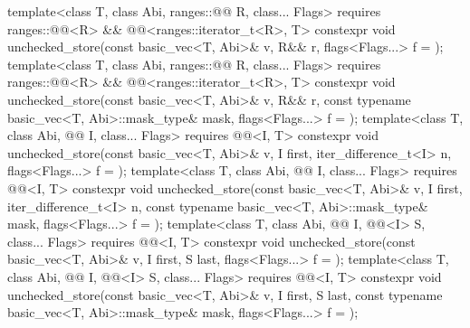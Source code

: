 \begin{codeblock}
{  template<class T, class Abi, ranges::@@ R, class... Flags>
    requires ranges::@@<R> && @@<ranges::iterator_t<R>, T>
    constexpr void unchecked_store(const basic_vec<T, Abi>& v, R&& r,
                                   flags<Flags...> f = {});
  template<class T, class Abi, ranges::@@ R, class... Flags>
    requires ranges::@@<R> && @@<ranges::iterator_t<R>, T>
    constexpr void unchecked_store(const basic_vec<T, Abi>& v, R&& r,
      const typename basic_vec<T, Abi>::mask_type& mask, flags<Flags...> f = {});
  template<class T, class Abi, @@ I, class... Flags>
    requires @@<I, T>
    constexpr void unchecked_store(const basic_vec<T, Abi>& v, I first,
                                   iter_difference_t<I> n, flags<Flags...> f = {});
  template<class T, class Abi, @@ I, class... Flags>
    requires @@<I, T>
    constexpr void unchecked_store(const basic_vec<T, Abi>& v, I first,
      iter_difference_t<I> n, const typename basic_vec<T, Abi>::mask_type& mask,
      flags<Flags...> f = {});
  template<class T, class Abi, @@ I, @@<I> S, class... Flags>
    requires @@<I, T>
    constexpr void unchecked_store(const basic_vec<T, Abi>& v, I first, S last,
                                   flags<Flags...> f = {});
  template<class T, class Abi, @@ I, @@<I> S, class... Flags>
    requires @@<I, T>
    constexpr void unchecked_store(const basic_vec<T, Abi>& v, I first, S last,
      const typename basic_vec<T, Abi>::mask_type& mask, flags<Flags...> f = {});

}
\end{codeblock}
